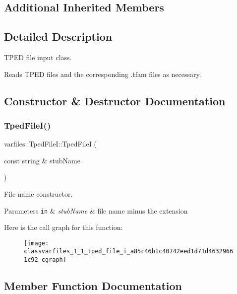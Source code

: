 \subsection*{Additional Inherited Members}


\subsection{Detailed Description}
T\+P\+ED file input class. 

Reads T\+P\+ED files and the corresponding .tfam files as necessary. 

\subsection{Constructor \& Destructor Documentation}
\mbox{\label{classvarfiles_1_1_tped_file_i_a85c46b1c40742eed1d71d46329661c92}} 
\subsubsection{\texorpdfstring{Tped\+File\+I()}{TpedFileI()}}
{\footnotesize\ttfamily varfiles\+::\+Tped\+File\+I\+::\+Tped\+FileI (\begin{DoxyParamCaption}\item[{const string \&}]{stub\+Name }\end{DoxyParamCaption})\hspace{0.3cm}{\ttfamily [inline]}}



File name constructor. 


\begin{DoxyParams}[1]{Parameters}
\mbox{\tt in}  & {\em stub\+Name} & file name minus the extension \\
\hline
\end{DoxyParams}
Here is the call graph for this function\+:\nopagebreak
\begin{figure}[H]
\begin{center}
\leavevmode
\texttt{[image: classvarfiles\_1\_1\_tped\_file\_i\_a85c46b1c40742eed1d71d46329661c92\_cgraph]}
\end{center}
\end{figure}


\subsection{Member Function Documentation}
\mbox{\label{classvarfiles_1_1_tped_file_i_afa47ef808ac99f8800d19f2ea0056d2e}} 
